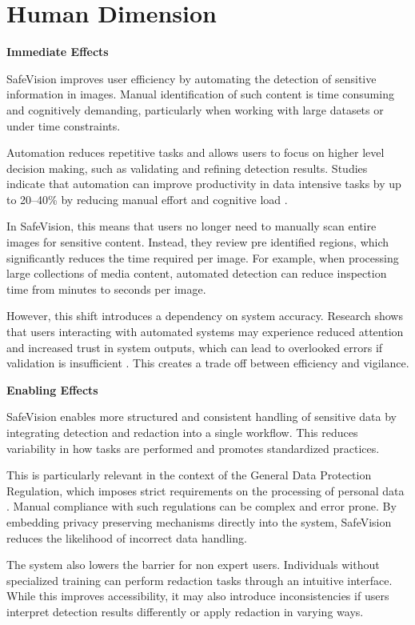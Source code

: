 \section{Human Dimension}

\noindent\textbf{Immediate Effects}

SafeVision improves user efficiency by automating the detection of sensitive information in images. Manual identification of such content is time consuming and cognitively demanding, particularly when working with large datasets or under time constraints.

Automation reduces repetitive tasks and allows users to focus on higher level decision making, such as validating and refining detection results. Studies indicate that automation can improve productivity in data intensive tasks by up to 20--40\% by reducing manual effort and cognitive load \cite{bessen2019ai}.

In SafeVision, this means that users no longer need to manually scan entire images for sensitive content. Instead, they review pre identified regions, which significantly reduces the time required per image. For example, when processing large collections of media content, automated detection can reduce inspection time from minutes to seconds per image.

However, this shift introduces a dependency on system accuracy. Research shows that users interacting with automated systems may experience reduced attention and increased trust in system outputs, which can lead to overlooked errors if validation is insufficient \cite{parasuraman1997humans}. This creates a trade off between efficiency and vigilance.

\noindent\textbf{Enabling Effects}

SafeVision enables more structured and consistent handling of sensitive data by integrating detection and redaction into a single workflow. This reduces variability in how tasks are performed and promotes standardized practices.

This is particularly relevant in the context of the General Data Protection Regulation, which imposes strict requirements on the processing of personal data \cite{voigt2017gdpr}. Manual compliance with such regulations can be complex and error prone. By embedding privacy preserving mechanisms directly into the system, SafeVision reduces the likelihood of incorrect data handling.

The system also lowers the barrier for non expert users. Individuals without specialized training can perform redaction tasks through an intuitive interface. While this improves accessibility, it may also introduce inconsistencies if users interpret detection results differently or apply redaction in varying ways.


